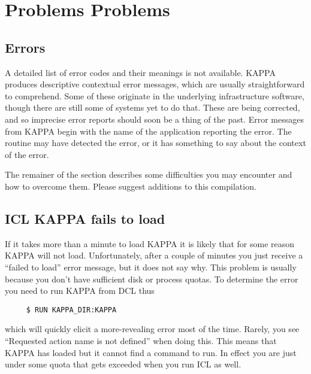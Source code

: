 {\section{Problems Problems}
\label{se:probpage}
\subsection{Errors}
A detailed list of error codes and their meanings is not available.
{\small KAPPA} produces descriptive contextual error messages, which are
usually straightforward to comprehend.  Some of these originate in
the underlying infrastructure software, though there are still some
of systems yet to do that.  These are being corrected, and so
imprecise error reports should soon be a thing of the past. Error
messages from {\small KAPPA} begin with the name of the application reporting
the error. The routine may have detected the error, or it has
something to say about the context of the error. 

The remainer of the section describes some difficulties you may encounter
and how to overcome them.  Please suggest additions to this compilation.

\subsection{ICL KAPPA fails to load}
If it takes more than a minute to load {\small KAPPA}
it is likely that for some reason {\small KAPPA} will not load.
Unfortunately, after a couple of minutes you just receive a ``failed
to load'' error message, but it does not say why.  This problem
is usually because you
don't have sufficient disk or process quotas.  To determine the error
you need to run KAPPA from {\small DCL} thus

\small
\begin{verbatim}
     $ RUN KAPPA_DIR:KAPPA
\end{verbatim}
\normalsize
which will quickly elicit a more-revealing error most of the time.
Rarely, you see ``Requested action name is not defined'' when doing
this.  This means that {\small KAPPA} has loaded but it cannot find
a command to run. In effect you are just under some quota that
gets exceeded when you run {\small ICL} as well.

}
